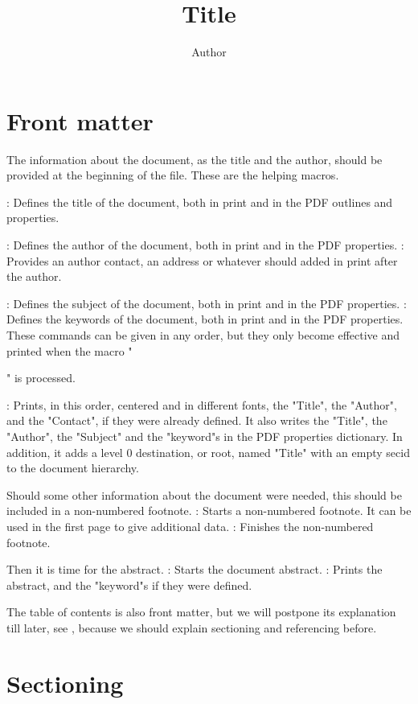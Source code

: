 \section{Front matter}

The information about the document, as the title and the author,
should be provided at the beginning of the file.
These are the helping macros.
\command\title{Title}: Defines the title
 of the document, both in print and in the PDF outlines and properties.
\command\author{Author}: Defines the author
 of the document, both in print and in the PDF properties.
\command{}: Provides an author contact, an address
 or whatever should added in print after the author.
\command\subject{Subject}: Defines the subject
 of the document, both in print and in the PDF properties.
\command{}: Defines the keywords
 of the document, both in print and in the PDF properties.
\continuepar
These commands can be given in any order,
but they only become effective and printed
when the macro "\maketitle" is processed.
\command\maketitle: Prints, in this order, centered and in
different fonts, the "Title", the "Author", and the "Contact",
if they were already defined.
It also writes the "Title", the "Author", the "Subject" and
the "keyword"s in the PDF properties dictionary.
In addition, it adds a level 0 destination, or root,
named "Title" with an empty {\sc secid} to the document
hierarchy.

Should some other information about the document were needed,
this should be included in a non-numbered footnote.
\command\beginnote: Starts a non-numbered footnote.
 It can be used in the first page to give additional data.
\command\endnote: Finishes the non-numbered footnote.

Then it is time for the abstract.
\command\beginabstract: Starts the document abstract.
\command\endabstract: Prints the abstract, and the
"keyword"s if they were defined.

The table of contents is also front matter,
but we will postpone its explanation till later,
see ,
because we should explain sectioning and referencing before.


\section{Sectioning}

